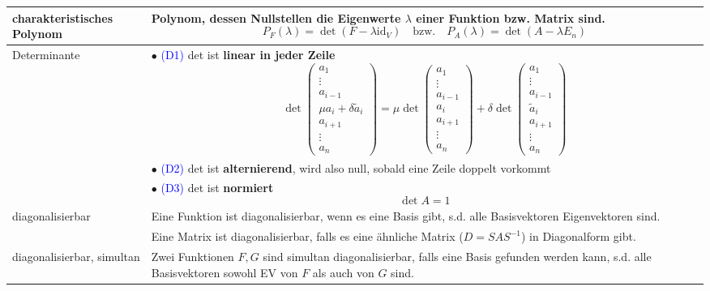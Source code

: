 \documentclass{article}
\begin{document}
\begin{xltabular}{\linewidth}{p{0.33\textwidth}|X}
	\hline
		charakteristisches Polynom & Polynom, dessen Nullstellen die Eigenwerte $\lambda$ einer Funktion bzw. Matrix sind.
			$$P_F(\lambda) = \det(F - \lambda \text{id}_V) \quad \text{bzw.}\quad P_A(\lambda) = \det(A - \lambda E_n)$$ \\
	\hline
		Determinante & $\bullet$ \textcolor{blue}{(D1)} det ist \textbf{linear in jeder Zeile}
			$$\det
			\begin{pmatrix}
				a_1\\ \vdots\\ a_{i-1}\\ \mu a_i + \delta \tilde{a}_i\\ a_{i+1}\\ \vdots \\ a_n
			\end{pmatrix}
			=
			\mu
			\det
			\begin{pmatrix}
				a_1\\ \vdots\\ a_{i-1}\\ a_i \\ a_{i+1}\\ \vdots \\ a_n
			\end{pmatrix}
			+
			\delta
			\det
			\begin{pmatrix}
				a_1\\ \vdots\\ a_{i-1}\\ \tilde{a}_i \\ a_{i+1}\\ \vdots \\ a_n
			\end{pmatrix}
			$$ \\
		& $\bullet$ \textcolor{blue}{(D2)} det ist \textbf{alternierend}, wird also null, sobald eine Zeile doppelt vorkommt \\
		& $\bullet$ \textcolor{blue}{(D3)} det ist \textbf{normiert}
			$$\det A = 1$$ \\
	\hline
		diagonalisierbar & Eine Funktion ist diagonalisierbar, wenn es eine Basis gibt, s.d. alle Basisvektoren Eigenvektoren sind.\\
		& Eine Matrix ist diagonalisierbar, falls es eine ähnliche Matrix ($D = SAS^{-1}$) in Diagonalform gibt.\\
	\hline
		diagonalisierbar, simultan & Zwei Funktionen $F,G$ sind simultan diagonalisierbar, falls eine Basis gefunden werden kann, s.d. alle Basisvektoren sowohl EV von $F$ als auch von $G$ sind.\\

\end{xltabular}
\end{document}
